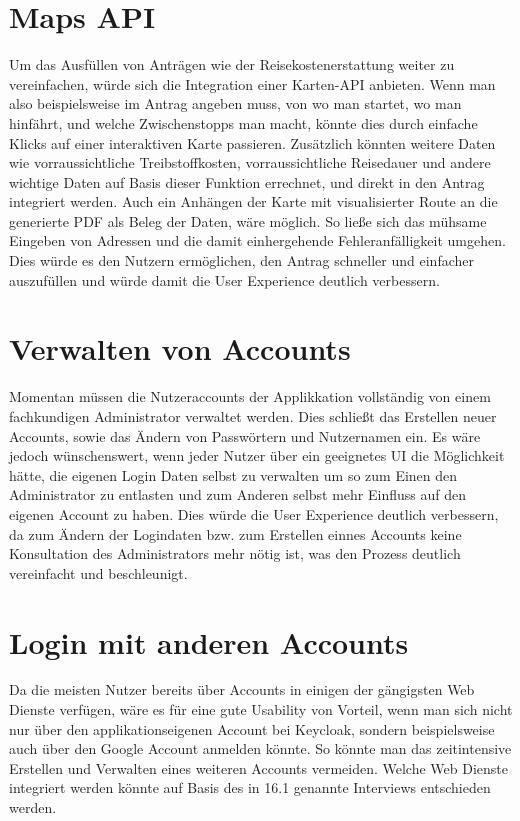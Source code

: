 \section{Maps \ac{API}}\label{sec: maps api}
Um das Ausfüllen von Anträgen wie der Reisekostenerstattung weiter zu vereinfachen, würde 
sich die Integration einer Karten-\ac{API} anbieten. Wenn man also beispielsweise im 
Antrag angeben muss, von wo man startet, wo man hinfährt, und welche Zwischenstopps man 
macht, könnte dies durch einfache Klicks auf einer interaktiven Karte passieren. Zusätzlich 
könnten weitere Daten wie vorraussichtliche Treibstoffkosten, vorraussichtliche Reisedauer 
und andere wichtige Daten auf Basis dieser Funktion errechnet, und direkt in den Antrag 
integriert werden. Auch ein Anhängen der Karte mit visualisierter Route an die generierte
PDF als Beleg der Daten, wäre möglich. So ließe sich das mühsame Eingeben von Adressen 
und die damit einhergehende Fehleranfälligkeit umgehen. Dies würde es den Nutzern 
ermöglichen, den Antrag schneller und einfacher auszufüllen und würde damit die User 
Experience deutlich verbessern.

\section{Verwalten von Accounts}\label{sec: verwalten von Accounts}
Momentan müssen die Nutzeraccounts der Applikkation vollständig von einem fachkundigen 
Administrator verwaltet werden. Dies schließt das Erstellen neuer Accounts, sowie das 
Ändern von Passwörtern und Nutzernamen ein. Es wäre jedoch wünschenswert, wenn jeder 
Nutzer über ein geeignetes \ac{UI} die Möglichkeit hätte, die eigenen Login Daten selbst 
zu verwalten um so zum Einen den Administrator zu entlasten und zum Anderen selbst mehr 
Einfluss auf den eigenen Account zu haben. Dies würde die User Experience deutlich 
verbessern, da zum Ändern der Logindaten bzw. zum Erstellen einnes Accounts keine 
Konsultation des Administrators mehr nötig ist, was den Prozess deutlich vereinfacht und 
beschleunigt.

\section{Login mit anderen Accounts}\label{sec: login mit anderen Accounts}
Da die meisten Nutzer bereits über Accounts in einigen der gängigsten Web Dienste verfügen, 
wäre es für eine gute Usability von Vorteil, wenn man sich nicht nur über den 
applikationseigenen Account bei Keycloak, sondern beispielsweise auch über den Google 
Account anmelden könnte. So könnte man das zeitintensive Erstellen und Verwalten eines 
weiteren Accounts vermeiden. Welche Web Dienste integriert werden könnte auf Basis des in 
16.1 genannte Interviews entschieden werden.